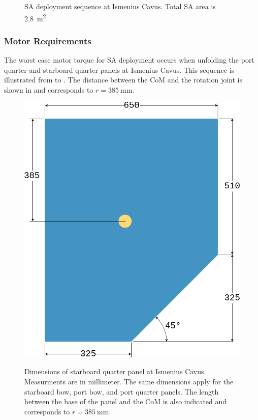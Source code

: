 \begin{figure}[h]
\begin{subfigure}[t]{\subfigureWidth}
		\label{fig:sub:deployment-sequence-ismenius-cavus-completed}
	\end{subfigure}
    \caption[Solar array deployment sequence at Ismenius Cavus]
    {\ac{SA} deployment sequence at Ismenius Cavus. Total \ac{SA} area is \SI{2.8}{\meter\squared}.}
	\label{fig:deployment-sequence-ismenius-cavus}
\vspace{-2ex}
\end{figure}

\clearpage
\subsubsection{Motor Requirements}
The worst case motor torque for \ac{SA} deployment occurs when unfolding the port quarter and starboard quarter panels at Ismenius Cavus. This sequence is illustrated from  to . The distance between the \ac{CoM} and the rotation joint is shown in  and corresponds to $r = \SI{385}{\milli\metre}$.

\vspace{0.25cm}

\begin{figure}[h]
  \captionsetup[subfigure]{justification=centering}
  \centering
  \hypersetup{linkcolor=captionTextColor}
  \includegraphics[width=0.55\linewidth]{sections/power-system-design/solar-array/images/ismenius-cavus-solar-panel-starboard-quarter.png}\\
  \caption[Dimensions of starboard quarter panel at Ismenius Cavus]
          {Dimensions of starboard quarter panel at Ismenius Cavus. Measurments are in millimeter. The same dimensions apply for the starboard bow, port bow, and port quarter panels. The length between the base of the panel and the \ac{CoM} is also indicated and corresponds to $r = \SI{385}{\milli\metre}$.}
  \label{fig:ismenius-cavus-solar-panel-starboard-quarter-dimensions}
\end{figure}

